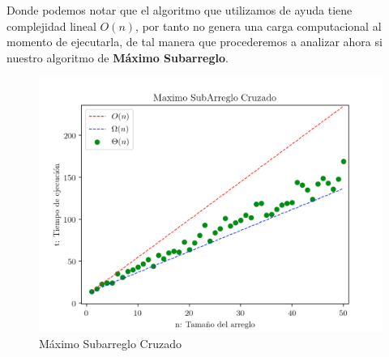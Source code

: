 \documentclass[12pt,twoside]{article}
\begin{document}
Donde podemos notar que el algoritmo que utilizamos de ayuda tiene complejidad lineal $O(n)$, por tanto no genera una carga computacional
al momento de ejecutarla, de tal manera que procederemos a analizar ahora si nuestro algoritmo de \textbf{Máximo Subarreglo}.
\begin{figure}[h]
  \centering
    \includegraphics[height=0.75\textwidth]{Figure2}
  \caption{Máximo Subarreglo Cruzado}
  \label{fig:ejemplo1}
\end{figure}
\newpage
\end{document}
